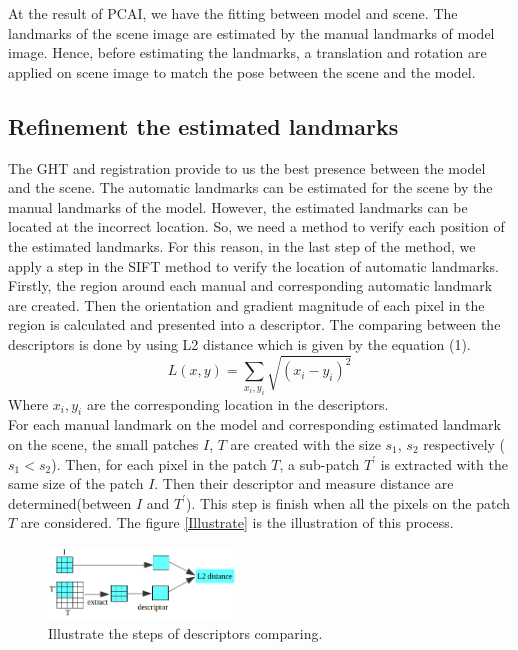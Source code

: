 \documentclass[twoside,twocolumn,10pt]{article}
\begin{document}
At the result of PCAI, we have the fitting between model and scene. The landmarks of the scene
image are estimated by the manual landmarks of model image. Hence, before estimating the
landmarks, a translation and rotation are applied on scene image to
match the pose between the scene and the model. 

\subsection{Refinement the estimated landmarks}
The GHT and registration provide to us the best presence between the model and the scene. The automatic landmarks can be estimated for the scene by the manual landmarks of the model. However, the estimated landmarks can be located at the incorrect location. So, we need a method to verify each position of the estimated landmarks. For this reason, in the last step of the method, we apply a step in the SIFT\cite{lowe2004distinctive} method to verify the location of automatic landmarks. Firstly, the region around each manual and corresponding automatic landmark are created. Then the orientation and gradient magnitude of each pixel in the region is calculated and presented into a descriptor. The comparing between the descriptors is done by using L2 distance which is given by the equation (1).
\begin{equation}
\label{eq:cross-correlation}
	L(x,y) = \sum\limits_{x_i,y_i}\sqrt{(x_i-y_i)^2}
\end{equation}
Where $x_i, y_i $ are the corresponding location in the descriptors.\\

For each manual landmark on the model and corresponding estimated landmark on the scene, the small patches \textit{$I$}, \textit{$T$} are created with the size $s_1$, $s_2$ respectively ($s_1 < s_2$). Then, for each pixel in the patch \textit{$T$}, a sub-patch \textit{$T^{'}$} is extracted with the same size of the patch \textit{$I$}. Then their descriptor and measure distance are determined(between \textit{$I$} and \textit{$T^{'}$}). This step is finish when all the pixels on the patch \textit{$T$} are considered. The figure \ref{Illustrate} is the illustration of this process.
\begin{figure}[htb]
    \centering
    \includegraphics[width=0.45\textwidth]{./images/illustration_SIFT}
    \caption{Illustrate the steps of descriptors comparing.}
    \label{fig:Illustrate}
\end{figure}
\end{document}
